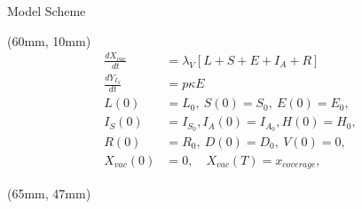 \begin{frame}{Model Scheme}
    \begin{textblock*}{65mm}(60mm, 10mm)
         \begin{equation*}
             \begin{aligned}
                     \frac{dX_{vac}}{dt}
                         &=
                     \lambda_V
                     \left[
                         L + S + E + I_A + R
                     \right]
                 \\
                     \frac{d Y_{I_S}}{dt}
                         & = p \kappa E
                 \\
                     L(0) &= L_0, \ S(0) = S_0,
                     \ E(0) = E_0,
                 \\
                 I_S(0) &= I_{S_{0}},
                 I_A(0) = I_{A_{0}},
                 H(0) = H_0,
                 \\
                 R(0) &= R_0, \ D(0) = D_0, \ V(0) = 0,
                 \\
                 X_{vac}(0) & = 0, \quad
                 X_{vac}(T) = x_{coverage},
             \end{aligned}
         \end{equation*}    
    \end{textblock*}

    \begin{textblock*}{60mm}(65mm, 47mm)
    \end{textblock*}
    


\end{frame}
